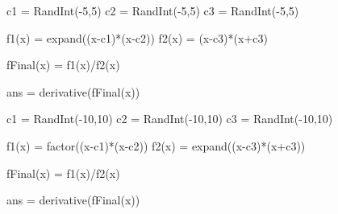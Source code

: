 
\begin{sagesilent}

c1 = RandInt(-5,5)
c2 = RandInt(-5,5)
c3 = RandInt(-5,5)

f1(x) = expand((x-c1)*(x-c2))
f2(x) = (x-c3)*(x+c3)

fFinal(x) = f1(x)/f2(x)

ans = derivative(fFinal(x))

\end{sagesilent}



\begin{sagesilent}

c1 = RandInt(-10,10)
c2 = RandInt(-10,10)
c3 = RandInt(-10,10)

f1(x) = factor((x-c1)*(x-c2))
f2(x) = expand((x-c3)*(x+c3))

fFinal(x) = f1(x)/f2(x)

ans = derivative(fFinal(x))

\end{sagesilent}



